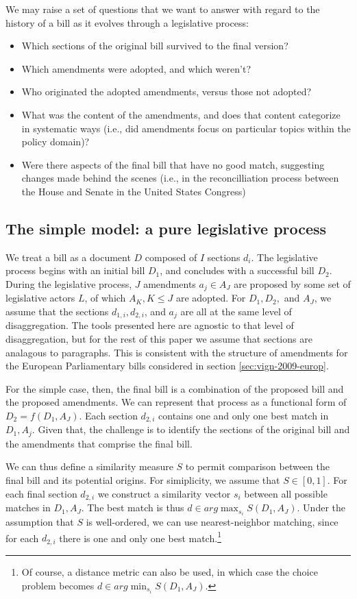 \documentclass[11pt]{article}
\begin{document}
We may raise a set of questions that we want to answer with regard to
the history of a bill as it evolves through a legislative process:
\begin{itemize}
\item Which sections of the original bill survived to the final version?
\item Which amendments were adopted, and which weren't?
\item Who originated the adopted amendments, versus those not adopted?
\item What was the content of the amendments, and does that content
  categorize in systematic ways (i.e., did amendments focus on
  particular topics within the policy domain)?
\item Were there aspects of the final bill that have no good match,
  suggesting changes made behind the scenes (i.e., in the
  reconcilliation process between the House and Senate in the United States Congress)
\end{itemize}


\subsection{The simple model: a pure legislative process}
\label{sec:simple-model:-pure}

We treat a bill as a document $D$ composed of $I$ sections $d_i$. The
legislative process begins with an initial bill $D_1$, and concludes
with a successful bill $D_2$. During the legislative process, $J$
amendments $a_j \in A_J$ are
proposed by some set of legislative actors $L$, of which $A_K, K \leq
J$ are adopted. For $D_1, D_2,$ and $A_J$, we assume that the sections
$d_{1,i}, d_{2,i}$, and $a_j$ are all at the same level of
disaggregation. The tools presented here are agnostic to that level of
disaggregation, but for the rest of this paper we assume that sections
are analagous to paragraphs. This is consistent with the structure of
amendments for the European Parliamentary bills considered in section
\ref{sec:vign-2009-europ}.

For the simple case, then, the final bill is a
combination of the proposed bill and the proposed
amendments. We can represent that process as a functional form of $D_2
= f(D_1, A_J)$. Each section $d_{2,i}$ contains one and only one best
match in $D_1, A_j$. Given that, the challenge is to identify the sections
of the original bill and the amendments that comprise the final
bill. 

We can thus define a similarity measure $S$ to permit comparison
between the final bill and its potential origins. For simiplicity, we
assume that $S \in [0,1]$. For each final section $d_{2,i}$ we
construct a similarity vector $s_i$ between all possible matches in
$D_1, A_J$. The best match is thus $d \in arg \max_{s_i} S(D_1,
A_J)$. Under the assumption that $S$ is well-ordered, we can use
nearest-neighbor matching, since for each $d_{2,i}$ there is one and
only one best match.\footnote{Of course, a distance metric can also be
used, in which case the choice problem becomes $d \in arg \min_{s_i}
S(D_1, A_J)$.}
\end{document}
